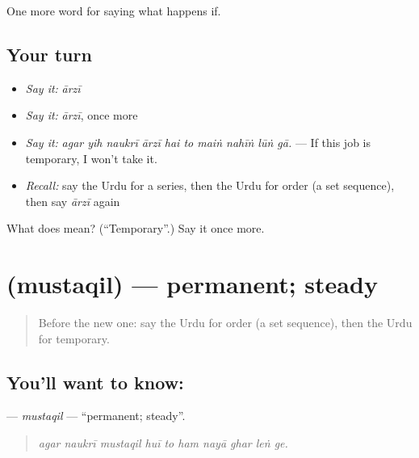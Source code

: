 \begin{grammarlens}[title={What you've built}]
One more word for saying what happens if.
\end{grammarlens}

\subsection*{Your turn}
\begin{itemize}
\raggedright
  \item \emph{Say it:} \emph{ārzī}
  \item \emph{Say it:} \emph{ārzī}, once more
  \item \emph{Say it:} \emph{agar yih naukrī ārzī hai to maiṅ nahīṅ lūṅ gā.} — If this job is temporary, I won't take it.
  \item \emph{Recall:} say the Urdu for a series, then the Urdu for order (a set sequence), then say \emph{ārzī} again
\end{itemize}

\begin{tcolorbox}[breakable,colback=teal!4,colframe=teal!35!black,title={Before you move on}]
What does  mean? (\textquotedblleft{}Temporary\textquotedblright{}.) Say it once more.
\end{tcolorbox}
\section[\texorpdfstring{\ur{مستقل} (mustaqil)}{مستقل (mustaqil)}]{ (mustaqil) — permanent; steady}

\label{lesson:UR-C545-mustaqil}



\begin{quote}
Before the new one: say the Urdu for order (a set sequence), then the Urdu for temporary.
\end{quote}

\subsection*{You'll want to know: }
\textbf{} — \emph{mustaqil} — \textquotedblleft{}permanent; steady\textquotedblright{}.

\begin{quote}
         
\end{quote}

\begin{quote}
\emph{agar naukrī mustaqil huī to ham nayā ghar leṅ ge.}
\end{quote}

